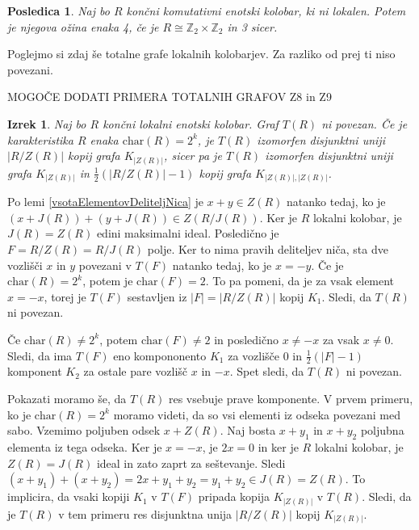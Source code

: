 \documentclass[a4paper, 12pt]{amsart}
\theoremstyle{definition} %
\theoremstyle{plain} %
\newtheorem{izrek}[definicija]{Izrek}
\newtheorem{posledica}[definicija]{Posledica}
\newcommand{\Z}{\mathbb Z}
\begin{document}
\begin{posledica}
Naj bo $R$ končni komutativni enotski kolobar, ki ni lokalen. Potem je njegova ožina enaka 4, če je $R \cong \Z_2 \times \Z_2$ in 3 sicer.
\end{posledica}

Poglejmo si zdaj še totalne grafe lokalnih kolobarjev. Za razliko od prej ti niso povezani.

MOGOČE DODATI PRIMERA TOTALNIH GRAFOV  Z8 in Z9

\begin{izrek}
\label{klasifikacijaT(R)zaLokalenKolobar}
Naj bo $R$ končni lokalni enotski kolobar. Graf $T(R)$ ni povezan. Če je karakteristika $R$ enaka $\textrm{char} (R) = 2^k$, je $T(R)$ izomorfen disjunktni uniji $|R/Z(R)|$ kopij grafa $K_{|Z(R)|}$, sicer pa je $T(R)$ izomorfen disjunktni uniji grafa $K_{|Z(R)|}$ in $\frac{1}{2}(|R/Z(R)| - 1)$ kopij grafa    $K_{|Z(R)|, |Z(R)|}$.
\end{izrek}

\proof
Po lemi \ref{vsotaElementovDeliteljNica} je $x+y \in Z(R)$ natanko tedaj, ko  je $(x+J(R)) + (y+J(R))  \in Z(R/J(R))$. Ker je $R$ lokalni kolobar, je $J(R) = Z(R)$ edini maksimalni ideal. Posledično je $ F = R/Z(R) = R/J(R)$ polje. Ker to nima pravih deliteljev niča, sta dve vozlišči $x$ in $y$ povezani v $T(F)$ natanko tedaj, ko je $x=-y$. 
Če je $\textrm{char}(R) = 2^k$, potem je $\textrm{char}(F) = 2$. To pa pomeni, da je za vsak element $x = -x$, torej je $T(F)$ sestavljen iz $|F| = |R/Z(R)|$ kopij $K_1$. Sledi, da $T(R)$ ni povezan.

Če $\textrm{char}(R) \neq 2^k$, potem $\textrm{char}(F)\neq 2$ in posledično $x\neq -x$ za vsak $x\neq 0$. Sledi, da ima $T(F)$ eno kompononento $K_1$ za vozlišče 0 in $\frac{1}{2}(|F| - 1)$ komponent $K_2$ za ostale pare vozlišč $x$ in $-x$. Spet sledi, da $T(R)$ ni povezan.

 Pokazati moramo še, da $T(R)$ res vsebuje prave komponente.
V prvem primeru, ko je $ \textrm{char}(R) = 2^k$ moramo videti, da so vsi elementi iz odseka povezani med sabo. Vzemimo poljuben odsek $x+Z(R)$. Naj bosta $x+ y_1$ in $x+y_2$ poljubna elementa iz tega odseka. Ker je $x=-x$, je $2x = 0$ in ker je $R$ lokalni kolobar, je $Z(R) = J(R)$ ideal in zato zaprt za seštevanje. Sledi $(x+ y_1 ) + (x+y_2)  = 2x + y_1 +y_2 = y_1 + y_2 \in J(R) = Z(R)$. To implicira, da vsaki kopiji $K_1$ v $T(F)$ pripada kopija $K_{|Z(R)|}$ v $T(R)$. Sledi, da je $T(R)$ v tem primeru res disjunktna unija $|R/Z(R)|$ kopij $K_{|Z(R)|}$.
\end{document}
